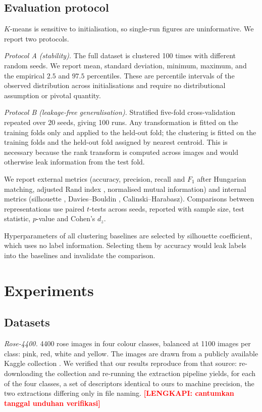 \documentclass[pdflatex,sn-basic]{sn-jnl}
\theoremstyle{thmstyleone}%
\theoremstyle{thmstyletwo}%
\theoremstyle{thmstylethree}%
\newcommand{\TODO}[1]{\textcolor{red}{\textbf{[LENGKAPI: #1]}}}
\begin{document}
\subsection{Evaluation protocol}\label{sec:protocol}

$K$-means is sensitive to initialisation, so single-run figures are
uninformative. We report two protocols.

\emph{Protocol A (stability).} The full dataset is clustered 100 times with
different random seeds. We report mean, standard deviation, minimum, maximum,
and the empirical $2.5$ and $97.5$ percentiles. These are percentile intervals
of the observed distribution across initialisations and require no
distributional assumption or pivotal quantity.

\emph{Protocol B (leakage-free generalisation).} Stratified five-fold
cross-validation repeated over 20 seeds, giving 100 runs. Any transformation is
fitted on the training folds only and applied to the held-out fold; the
clustering is fitted on the training folds and the held-out fold assigned by
nearest centroid. This is necessary because the rank transform is computed
across images and would otherwise leak information from the test fold.

We report external metrics (accuracy, precision, recall and $F_1$ after
Hungarian matching, adjusted Rand index \cite{ref:hubert1985}, normalised
mutual information) and internal metrics (silhouette \cite{ref:rousseeuw1987},
Davies--Bouldin \cite{ref:davies1979}, Calinski--Harabasz). Comparisons between
representations use paired $t$-tests across seeds, reported with sample size,
test statistic, $p$-value and Cohen's $d_z$.

Hyperparameters of all clustering baselines are selected by silhouette
coefficient, which uses no label information. Selecting them by accuracy would
leak labels into the baselines and invalidate the comparison.

\section{Experiments}\label{sec:experiments}

\subsection{Datasets}\label{sec:datasets}

\emph{Rose-4400.} 4400 rose images in four colour classes, balanced at 1100
images per class: pink, red, white and yellow. The images are drawn from a
publicly available Kaggle collection \cite{ref:rosekaggle}. We verified that
our results reproduce from that source: re-downloading the collection and
re-running the extraction pipeline yields, for each of the four classes, a set
of descriptors identical to ours to machine precision, the two extractions
differing only in file naming. \TODO{cantumkan tanggal unduhan verifikasi}
\end{document}

